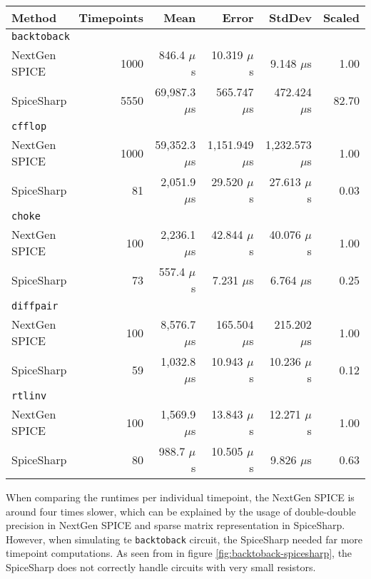 \begin{center}
	\begin{longtable}{|l|r|r|r|r|r|}
		\hline
Method & Timepoints &        Mean &        Error &       StdDev & Scaled \\ \hline \hline
\multicolumn{6}{|l|}{\texttt{backtoback}} \\ \hline
NextGen SPICE &       1000 &    846.4 $\mu{}$s &    10.319 $\mu{}$s &     9.148 $\mu{}$s &   1.00 \\
SpiceSharp &       5550 & 69,987.3 $\mu{}$s &   565.747 $\mu{}$s &   472.424 $\mu{}$s &  82.70 \\ \hline \hline

\multicolumn{6}{|l|}{\texttt{cfflop}} \\ \hline
NextGen SPICE &       1000 & 59,352.3 $\mu{}$s & 1,151.949 $\mu{}$s & 1,232.573 $\mu{}$s &   1.00 \\
SpiceSharp &         81 &  2,051.9 $\mu{}$s &    29.520 $\mu{}$s &    27.613 $\mu{}$s &   0.03 \\ \hline \hline

\multicolumn{6}{|l|}{\texttt{choke}} \\ \hline
NextGen SPICE &        100 &  2,236.1 $\mu{}$s &    42.844 $\mu{}$s &    40.076 $\mu{}$s &   1.00 \\
SpiceSharp &         73 &    557.4 $\mu{}$s &     7.231 $\mu{}$s &     6.764 $\mu{}$s &   0.25 \\ \hline \hline

\multicolumn{6}{|l|}{\texttt{diffpair}} \\ \hline
NextGen SPICE &        100 &  8,576.7 $\mu{}$s &   165.504 $\mu{}$s &   215.202 $\mu{}$s &   1.00 \\
SpiceSharp &         59 &  1,032.8 $\mu{}$s &    10.943 $\mu{}$s &    10.236 $\mu{}$s &   0.12 \\  \hline \hline

\multicolumn{6}{|l|}{\texttt{rtlinv}} \\ \hline
NextGen SPICE &        100 &  1,569.9 $\mu{}$s &    13.843 $\mu{}$s &    12.271 $\mu{}$s &   1.00 \\
SpiceSharp &         80 &    988.7 $\mu{}$s &    10.505 $\mu{}$s &     9.826 $\mu{}$s &   0.63 \\ \hline \hline
	\end{longtable}
\end{center}

When comparing the runtimes per individual timepoint, the NextGen SPICE is around four times slower, which can be explained by the usage of double-double precision in NextGen SPICE and sparse matrix representation in SpiceSharp. However, when simulating te \texttt{backtoback} circuit, the SpiceSharp needed far more timepoint computations. As seen from in figure \ref{fig:backtoback-spicesharp}, the SpiceSharp does not correctly handle circuits with very small resistors.

